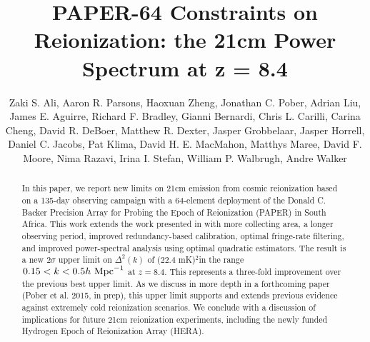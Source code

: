 \documentclass[twocolumn,numberedappendix]{emulateapj} \shorttitle{New Limits on the 21 cm Power Spectrum at $z=8.4$}
\newcommand{\hMpci}{h\ {\rm Mpc}^{-1}}
\newcommand{\mKlimit}{(22.4 mK)$^2$}
\newcommand{\pobercitep}{(Pober et al. 2015, in prep)}
\begin{document}
\title{PAPER-64 Constraints on Reionization: the 21cm Power Spectrum at z = 8.4}

\author{
Zaki S. Ali, 
Aaron R. Parsons, 
Haoxuan Zheng,
Jonathan C. Pober, 
Adrian Liu, 
James E. Aguirre,
Richard F. Bradley,
Gianni Bernardi, 
Chris L. Carilli,
Carina Cheng,
David R. DeBoer, 
Matthew R. Dexter,
Jasper Grobbelaar,
Jasper Horrell,
Daniel C. Jacobs, 
Pat Klima,
David H. E. MacMahon,
Matthys Maree,
David F. Moore,
Nima Razavi,
Irina I. Stefan,
William P. Walbrugh,
Andre Walker
}


\begin{abstract}
In this paper, we report new limits on 21cm emission from cosmic reionization
based on a 135-day observing campaign with a 64-element deployment of the
Donald C. Backer Precision Array for Probing the Epoch of Reionization (PAPER)
in South Africa.  This work extends the work presented in
\citet{parsons_et_al2014} with more collecting area, a longer observing period, improved redundancy-based
calibration, optimal fringe-rate filtering, and improved power-spectral
analysis using optimal quadratic estimators. The result is a new $2\sigma$
upper limit on $\Delta^2(k)$ of \mKlimit in the range
$0.15<k<0.5\hMpci$ at $z=8.4$.  This represents a three-fold improvement over the
previous best upper limit.  As we discuss in more depth in a forthcoming paper
\pobercitep, this upper limit supports and extends previous
evidence against extremely cold reionization scenarios.  We conclude with a
discussion of implications for future 21cm reionization experiments, including
the newly funded Hydrogen Epoch of Reionization Array (HERA).  
\end{abstract}
\end{document}
